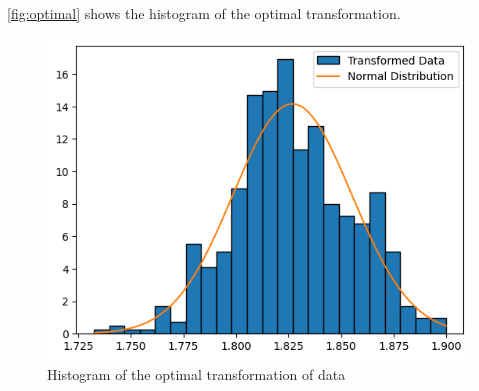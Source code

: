 \autoref{fig:optimal} shows the histogram of the optimal transformation.

\begin{figure}[!ht]
  \centering
  \includegraphics[width=.6\textwidth]{images/optimal-hist.png}
  \caption{Histogram of the optimal transformation of data}
  \label{fig:optimal}
\end{figure}
